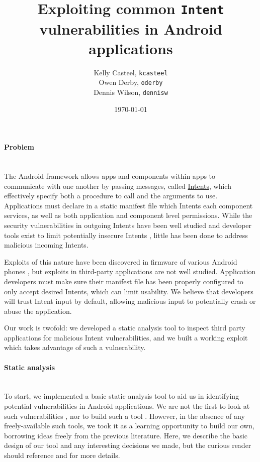 \documentclass[12pt,a4paper]{article}
\title{Exploiting common \texttt{Intent} vulnerabilities in Android %
applications}
\date{\today}
\author{Kelly Casteel, \texttt{kcasteel}\\Owen Derby, \texttt{oderby}\\Dennis
Wilson, \texttt{dennisw}}
\begin{document}
 

\maketitle

\paragraph{Problem} ~\\
The Android framework allows apps and components within apps to communicate with
one another by passing messages, called
\href{https://developer.android.com/reference/android/content/Intent.html}{Intents},
which effectively specify both a procedure to call and the arguments to use.
Applications must declare in a static manifest file which Intents each component
services, as well as both application and component level permissions. While the
security vulnerabilities in outgoing Intents have been well studied
\cite{chin_analyzing_2011} and developer tools exist to limit potentially
insecure Intents \cite{lu_chex_2012}, little has been done to address malicious
incoming Intents.

Exploits of this nature have been discovered in firmware of
various Android phones \cite{grace_systematic_2012}, but exploits in third-party
applications are not well studied. Application developers must make sure their
manifest file has been properly configured to only accept desired Intents, which
can limit usability. We believe that developers will trust Intent input by
default, allowing malicious input to potentially crash or abuse the application.

Our work is twofold: we developed a static analysis tool to inspect third party
applications for malicious Intent vulnerabilities, and we built a working
exploit which takes advantage of such a vulnerability.

\paragraph{Static analysis} ~\\
To start, we implemented a basic static analysis tool to aid us in identifying
potential vulnerabilities in Android applications. We are not the first to look
at such vulnerabilities \cite{chin_analyzing_2011}, nor to build such a tool
\cite{grace_systematic_2012}. However, in the absence of any freely-available
such tools, we took it as a learning opportunity to build our own, borrowing
ideas freely from the previous literature. Here, we describe the basic design
of our tool and any interesting decisions we made, but the curious reader should
reference \cite{chin_analyzing_2011} and \cite{grace_systematic_2012} for more
details.
\end{document}
